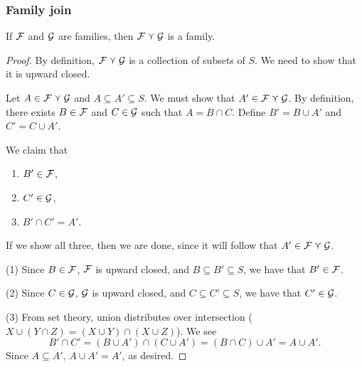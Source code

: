 \subsubsection{Family join}

\begin{theorem}
\label{thm_family_classcap_is_family}
    If $\mathcal{F}$ and $\mathcal{G}$ are families, then $\mathcal{F} \curlyvee \mathcal{G}$ is a family.
\end{theorem}

\begin{proof}
     By definition, $\mathcal{F} \curlyvee \mathcal{G}$ is a collection of subsets of $S$.  We need to show that it is upward closed.


    Let $A \in \mathcal{F} \curlyvee \mathcal{G}$ and $A \subseteq A' \subseteq S$.  We must show that $A' \in \mathcal{F} \curlyvee \mathcal{G}$.  By definition, there exists $B \in \mathcal{F}$ and $C \in \mathcal{G}$ such that $A = B \cap C$.  Define $B' = B \cup A'$ and $C' = C \cup A'$.

    We claim that
    \begin{enumerate}
        \item $B' \in \mathcal{F}$,
        \item $C' \in \mathcal{G}$,
        \item $B' \cap C' = A'$.
    \end{enumerate}
    If we show all three, then we are done, since it will follow that $A' \in \mathcal{F} \curlyvee \mathcal{G}$.
    
    (1) Since $B \in \mathcal{F}$, $\mathcal{F}$ is upward closed, and $B \subseteq B' \subseteq S$, we have that $B' \in \mathcal{F}$.

    (2) Since $C \in \mathcal{G}$, $\mathcal{G}$ is upward closed, and $C \subseteq C' \subseteq S$, we have that $C' \in \mathcal{G}$.

    (3) From set theory, union distributes over intersection ($X \cup (Y \cap Z) = (X \cup Y) \cap (X \cup Z)$).  We see
    \[B' \cap C' = (B \cup A') \cap (C \cup A') = (B \cap C) \cup A' = A \cup A'.\]
    Since $A \subseteq A'$, $A \cup A' = A'$, as desired.
\end{proof}

